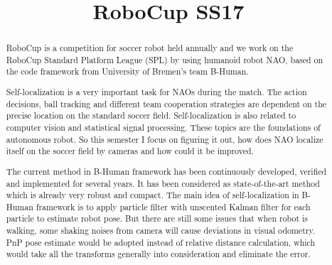 \documentclass[ICS, PP, english, final]{ICS_thesis}
\begin{document}
\title{RoboCup SS17}


\maketitle
\cleardoublepage


\phantom{u}
\begin{abstract}
RoboCup is a competition for soccer robot held annually and we work on the RoboCup Standard Platform League (SPL) by using humanoid robot NAO, based on the code framework from University of Bremen's team B-Human.

Self-localization is a very important task for NAOs during the match. The action decisions, ball tracking and different team cooperation strategies are dependent on the precise location on the standard soccer field. Self-localization is also related to computer vision and statistical signal processing. These topics are the foundations of autonomous robot. So this semester I focus on figuring it out, how does NAO localize itself on the soccer field by cameras and how could it be improved.

The current method in B-Human framework has been continuously developed, verified and implemented for several years. It has been considered as state-of-the-art method which is already very robust and compact. The main idea of self-localization in B-Human framework is to apply particle filter with unscented Kalman filter for each particle to estimate robot pose. But there are still some issues that when robot is walking, some shaking noises from camera will cause deviations in visual odometry. PnP pose estimate would be adopted instead of relative distance calculation, which would take all the transforms generally into consideration and eliminate the error.
\end{abstract}

\phantom{u}
\phantom{1}\vspace{6cm}
\begin{center}
\end{center}
\end{document}
